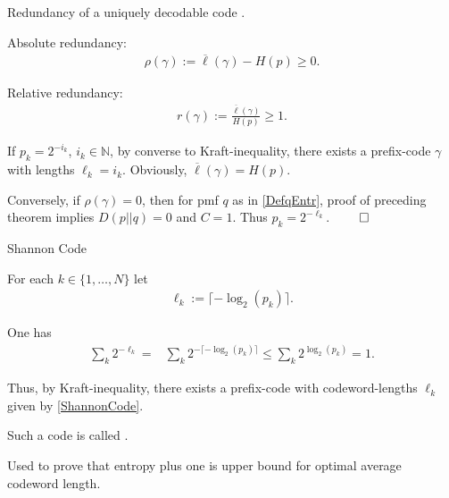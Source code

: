 \begin{frame}{Redundancy of a uniquely decodable code}
.
\bit
\item Absolute redundancy: 
\begin{align*}
\rho(\gamma):=\overline{\ell}(\gamma)-H(p)\geq 0.
\end{align*}
\item Relative redundancy:
\begin{align*}
r(\gamma):=\frac{\overline{\ell}(\gamma)}{H(p)}\geq 1.
\end{align*}
\eit
\smallskip
{}
\bit
\item If $p_k=2^{-i_k}$, $i_k\in\mathbb{N}$, by converse to Kraft-inequality, there exists a prefix-code $\gamma$ with lengths $\ell_k=i_k$. Obviously, 
$\overline{\ell}(\gamma)=H(p)$. 
\item Conversely, if $\rho(\gamma)=0$, then for pmf $q$ as in \eqref{DefqEntr}, proof of preceding theorem implies $D(p||q)=0$ and $C=1$. Thus 
$p_k=2^{-\ell_k}$. $\qed$
\eit
\end{frame}


\begin{frame}{Shannon Code}
\bit 
\item For each $k\in\{1,\dots,N\}$ let 
\begin{align}\label{ShannonCode}
\ell_k:=\lceil-\log_2({p_k})\rceil.
\end{align}
\item One has  
\begin{align*}
\sum_k2^{-\ell_k}=&\sum_k2^{-\lceil-\log_2({p_k})\rceil}
\leq\sum_k2^{\log_2(p_k)}=1.
\end{align*}
\item Thus, by Kraft-inequality, there exists a prefix-code with codeword-lengths $\ell_k$ given by \eqref{ShannonCode}. 
\item Such a code is called .
\item Used to prove that entropy plus one is upper bound for optimal average codeword length. 
\eit
\end{frame}







